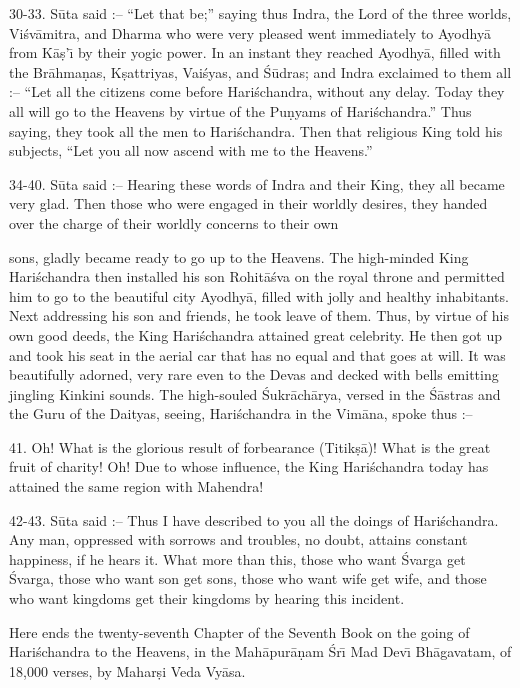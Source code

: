 30-33. S\=uta said :-- ``Let that be;'' saying thus Indra, the Lord of the three worlds, Vi\'sv\=amitra, and Dharma who were very pleased went immediately to Ayodhy\=a from K\=a\d{s}'\={\i} by their yogic power. In an instant they reached Ayodhy\=a, filled with the Br\=ahma\d{n}as, K\d{s}attriyas, Vai\'syas, and \'S\=udras; and Indra exclaimed to them all :-- ``Let all the citizens come before Hari\'schandra, without any delay. Today they all will go to the Heavens by virtue of the Pu\d{n}yams of Hari\'schandra.'' Thus saying, they took all the men to Hari\'schandra. Then that religious King told his subjects, ``Let you all now ascend with me to the Heavens.''

34-40. S\=uta said :-- Hearing these words of Indra and their King, they all became very glad. Then those who were engaged in their worldly desires, they handed over the charge of their worldly concerns to their own

sons, gladly became ready to go up to the Heavens. The high-minded King Hari\'schandra then installed his son Rohit\=a\'sva on the royal throne and permitted him to go to the beautiful city Ayodhy\=a, filled with jolly and healthy inhabitants. Next addressing his son and friends, he took leave of them. Thus, by virtue of his own good deeds, the King Hari\'schandra attained great celebrity. He then got up and took his seat in the aerial car that has no equal and that goes at will. It was beautifully adorned, very rare even to the Devas and decked with bells emitting jingling Kinkini sounds. The high-souled \'Sukr\=ach\=arya, versed in the \'S\=astras and the Guru of the Daityas, seeing, Hari\'schandra in the Vim\=ana, spoke thus :--

41. Oh! What is the glorious result of forbearance (Titik\d{s}\=a)! What is the great fruit of charity! Oh! Due to whose influence, the King Hari\'schandra today has attained the same region with Mahendra!

42-43. S\=uta said :-- Thus I have described to you all the doings of Hari\'schandra. Any man, oppressed with sorrows and troubles, no doubt, attains constant happiness, if he hears it. What more than this, those who want \'Svarga get \'Svarga, those who want son get sons, those who want wife get wife, and those who want kingdoms get their kingdoms by hearing this incident.

Here ends the twenty-seventh Chapter of the Seventh Book on the going of Hari\'schandra to the Heavens, in the Mah\=apur\=a\d{n}am \'Sr\={\i} Mad Dev\={\i} Bh\=agavatam, of 18,000 verses, by Mahar\d{s}i Veda Vy\=asa.



